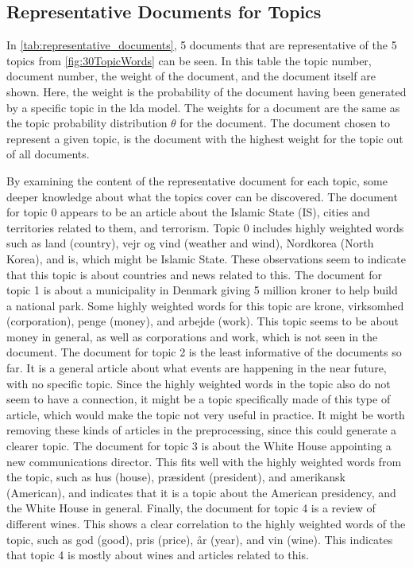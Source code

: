 \subsection{Representative Documents for Topics}
In \autoref{tab:representative_documents}, 5 documents that are representative of the 5 topics from \autoref{fig:30TopicWords} can be seen.
In this table the topic number, document number, the weight of the document, and the document itself are shown.
Here, the weight is the probability of the document having been generated by a specific topic in the \gls{lda} model.
The weights for a document are the same as the topic probability distribution $\theta$ for the document.
The document chosen to represent a given topic, is the document with the highest weight for the topic out of all documents.

By examining the content of the representative document for each topic, some deeper knowledge about what the topics cover can be discovered.
The document for topic 0 appears to be an article about the Islamic State (IS), cities and territories related to them, and terrorism.
Topic 0 includes highly weighted words such as land (country), vejr og vind (weather and wind), Nordkorea (North Korea), and is, which might be Islamic State.
These observations seem to indicate that this topic is about countries and news related to this.
The document for topic 1 is about a municipality in Denmark giving 5 million kroner to help build a national park.
Some highly weighted words for this topic are krone, virksomhed (corporation), penge (money), and arbejde (work).
This topic seems to be about money in general, as well as corporations and work, which is not seen in the document.
The document for topic 2 is the least informative of the documents so far.
It is a general article about what events are happening in the near future, with no specific topic.
Since the highly weighted words in the topic also do not seem to have a connection, it might be a topic specifically made of this type of article, which would make the topic not very useful in practice.
It might be worth removing these kinds of articles in the preprocessing, since this could generate a clearer topic.
The document for topic 3 is about the White House appointing a new communications director.
This fits well with the highly weighted words from the topic, such as hus (house), præsident (president), and amerikansk (American), and indicates that it is a topic about the American presidency, and the White House in general.
Finally, the document for topic 4 is a review of different wines.
This shows a clear correlation to the highly weighted words of the topic, such as god (good), pris (price), år (year), and vin (wine).
This indicates that topic 4 is mostly about wines and articles related to this.

